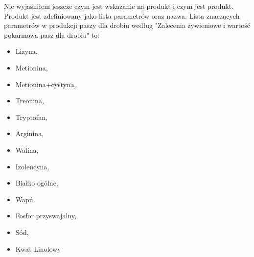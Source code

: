 \documentclass[shortabstract]{iithesis}
\begin{document}
Nie wyjaśniłem jeszcze czym jest wskazanie na produkt i czym jest produkt. Produkt jest zdefiniowany jako lista parametrów oraz nazwa.
Lista znaczących parametrów w produkcji paszy dla drobiu według "Zalecenia żywieniowe i wartość pokarmowa pasz dla drobiu" to:
\begin{itemize}
	\item	Lizyna, 
	\item	Metionina,
	\item 	Metionina+cystyna, 
	\item	Treonina, 
	\item	Tryptofan, 
	\item	Arginina, 
	\item	Walina, 
	\item	Izoleucyna, 
	\item	Białko ogólne, 
	\item	Wapń, 
    	\item 	Fosfor przyswajalny, 
    	\item	Sód, 
    	\item	Kwas Linolowy 
\end{itemize}







\end{document}

